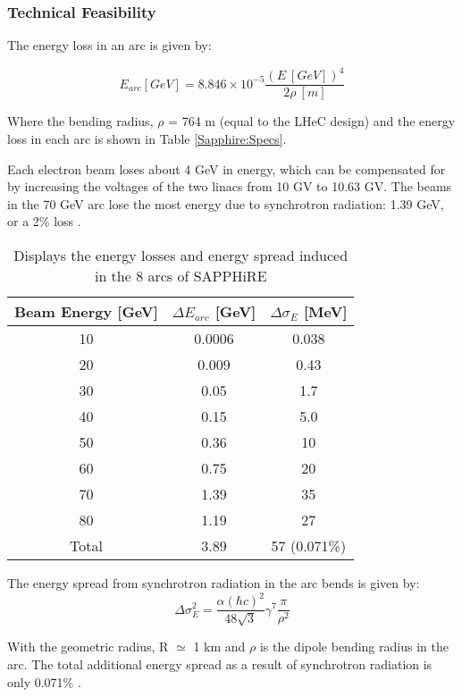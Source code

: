 \subsubsection{Technical Feasibility}
The energy loss in an arc is given by:

\begin{equation}
E_{arc}[GeV]=8.846 \times 10^{-5}\frac{(E \ [GeV])^{4}}{2\rho \ [m]}
\end{equation}

Where the bending radius, $\rho$ = 764 m (equal to the LHeC design) and the energy loss in each arc is shown in Table \ref{Sapphire:Specs}. 

Each electron beam loses about 4 GeV in energy, which can be compensated for by increasing the voltages of the two linacs from 10 GV to 10.63 GV. The beams in the 70 GeV arc lose the most energy due to synchrotron radiation: 1.39 GeV, or a 2\% loss \cite{Bogacz:SAPPHiRE}.

\begin{table}[!htb]
\begin{center}
\begin{tabular}{c c c}
\hline
\hline
Beam Energy [GeV] & $\Delta E_{arc}$ [GeV] & $\Delta\sigma_{E}$ [MeV]\\
\hline
10 & 0.0006 & 0.038\\
20 & 0.009 & 0.43\\
30 & 0.05 & 1.7\\
40 & 0.15 & 5.0\\
50 & 0.36 & 10\\
60 & 0.75 & 20\\
70 & 1.39 & 35\\
80 & 1.19 & 27\\
\hline
Total & 3.89 & 57 (0.071\%)\\
\hline
\hline
\end{tabular}
\caption{Displays the energy losses and energy spread induced in the 8 arcs of SAPPHiRE}
\end{center}
\end{table}

The energy spread from synchrotron radiation in the arc bends is given by:
\begin{equation}
\Delta\sigma^{2}_{E}=\frac{\alpha(\hbar c)^{2}}{48\sqrt{3}}\gamma^{7}\frac{\pi}{\rho^{2}}
\end{equation}

With the geometric radius, R $\simeq$ 1 km and $\rho$ is the dipole bending radius in the arc. The total additional energy spread as a result of synchrotron radiation is only 0.071\% \cite{Bogacz:SAPPHiRE}.

